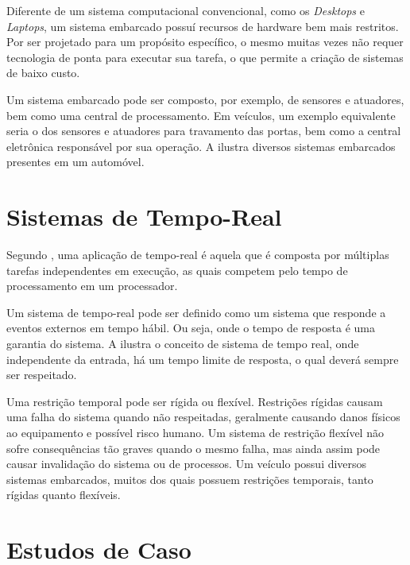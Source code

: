 Diferente de um sistema computacional convencional, como os \emph{Desktops} e \emph{Laptops}, um sistema embarcado possuí recursos de hardware bem mais restritos. Por ser projetado para um propósito específico, o mesmo muitas vezes não requer tecnologia de ponta para executar sua tarefa, o que permite a criação de sistemas de baixo custo.

Um sistema embarcado pode ser composto, por exemplo, de sensores e atuadores, bem como uma central de processamento. Em veículos, um exemplo equivalente seria o dos sensores e atuadores para travamento das portas, bem como a central eletrônica responsável por sua operação. A  ilustra diversos sistemas embarcados presentes em um automóvel.


\section{Sistemas de Tempo-Real}

Segundo , uma aplicação de tempo-real é aquela que é composta por múltiplas tarefas independentes em execução, as quais competem pelo tempo de processamento em um processador.

Um sistema de tempo-real pode ser definido como um sistema que responde a eventos externos em tempo hábil. Ou seja, onde o tempo de resposta é uma garantia do sistema. A  ilustra o conceito de sistema de tempo real, onde independente da entrada, há um tempo limite de resposta, o qual deverá sempre ser respeitado.


Uma restrição temporal pode ser rígida ou flexível. Restrições rígidas causam uma falha do sistema quando não respeitadas, geralmente causando danos físicos ao equipamento e possível risco humano. Um sistema de restrição flexível não sofre consequências tão graves quando o mesmo falha, mas ainda assim pode causar invalidação do sistema ou de processos. Um veículo possui diversos sistemas embarcados, muitos dos quais possuem restrições temporais, tanto rígidas quanto flexíveis.

\section{Estudos de Caso}

